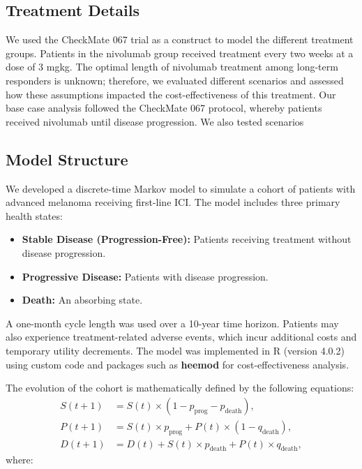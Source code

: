 \documentclass[preprint, 3p,
authoryear]{elsarticle} %
\begin{document}
\subsection{Treatment Details}\label{treatment-details}

We used the CheckMate 067 trial as a construct to model the different
treatment groups. Patients in the nivolumab group received treatment
every two weeks at a dose of 3 mgkg. The optimal length of nivolumab
treatment among long-term responders is unknown; therefore, we evaluated
different scenarios and assessed how these assumptions impacted the
cost-effectiveness of this treatment. Our base case analysis followed
the CheckMate 067 protocol, whereby patients received nivolumab until
disease progression. We also tested scenarios

\subsection{Model Structure}\label{model-structure}

We developed a discrete-time Markov model to simulate a cohort of
patients with advanced melanoma receiving first-line ICI. The model
includes three primary health states:

\begin{itemize}
\item
  \textbf{Stable Disease (Progression-Free):} Patients receiving
  treatment without disease progression.
\item
  \textbf{Progressive Disease:} Patients with disease progression.
\item
  \textbf{Death:} An absorbing state.
\end{itemize}

A one-month cycle length was used over a 10-year time horizon. Patients
may also experience treatment-related adverse events, which incur
additional costs and temporary utility decrements. The model was
implemented in R (version 4.0.2) using custom code and packages such as
\textbf{heemod} for cost-effectiveness analysis.

The evolution of the cohort is mathematically defined by the following
equations: \[
\begin{aligned}
S(t+1) &= S(t) \times (1 - p_{\text{prog}} - p_{\text{death}}), \\
P(t+1) &= S(t) \times p_{\text{prog}} + P(t) \times (1 - q_{\text{death}}), \\
D(t+1) &= D(t) + S(t) \times p_{\text{death}} + P(t) \times q_{\text{death}},
\end{aligned}
\] where:
\end{document}
